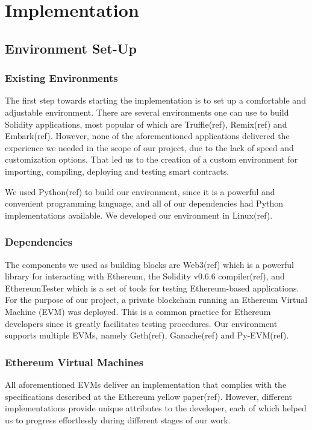 \section{Implementation}

\subsection{Environment Set-Up}

\subsubsection{Existing Environments}

The first step towards starting the implementation is to set up a
comfortable and adjustable environment. There are several environments
one can use to build Solidity applications, most popular of which are
Truffle(ref), Remix(ref) and Embark(ref). However, none of the
aforementioned applications delivered the experience we needed in the
scope of our project, due to the lack of speed and customization
options. That led us to the creation of a custom environment for
importing, compiling, deploying and testing smart contracts.

We used Python(ref) to build our environment, since it is a powerful
and convenient programming language, and all of our dependencies had
Python implementations available. We developed our environment in
Linux(ref).

\subsubsection{Dependencies}

The components we used as building blocks are Web3(ref) which is a
powerful library for interacting with Ethereum, the Solidity v0.6.6
compiler(ref), and EthereumTester which is a set of tools for testing
Ethereum-based applications. For the purpose of our project, a private
blockchain running an Ethereum Virtual Machine (EVM) was deployed.
This is a common practice for Ethereum developers since it greatly
facilitates testing procedures. Our environment supports multiple
EVMs, namely Geth(ref), Ganache(ref) and Py-EVM(ref).

\subsubsection{Ethereum Virtual Machines}

All aforementioned EVMs deliver an implementation that complies with
the specifications described at the Ethereum yellow paper(ref).
However, different implementations provide unique attributes to the
developer, each of which helped us to progress effortlessly during
different stages of our work.

